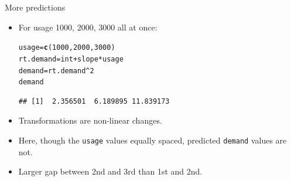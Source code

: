 \documentclass[unknownkeysallowed]{beamer}\usepackage[]{graphicx}\usepackage[]{color}
\makeatletter
\newcommand{\hlnum}[1]{\textcolor[rgb]{0.686,0.059,0.569}{#1}}%
\newcommand{\hlopt}[1]{\textcolor[rgb]{0,0,0}{#1}}%
\newcommand{\hlstd}[1]{\textcolor[rgb]{0.345,0.345,0.345}{#1}}%
\newcommand{\hlkwb}[1]{\textcolor[rgb]{0.69,0.353,0.396}{#1}}%
\newcommand{\hlkwd}[1]{\textcolor[rgb]{0.737,0.353,0.396}{\textbf{#1}}}%
\newenvironment{kframe}{%
 \def\at@end@of@kframe{}%
 \ifinner\ifhmode%
  \def\at@end@of@kframe{\end{minipage}}%
  \begin{minipage}{\columnwidth}%
 \fi\fi%
 \def\FrameCommand##1{\hskip\@totalleftmargin \hskip-\fboxsep
 \colorbox{shadecolor}{##1}\hskip-\fboxsep
     \hskip-\linewidth \hskip-\@totalleftmargin \hskip\columnwidth}%
 \MakeFramed {\advance\hsize-\width
   \@totalleftmargin\z@ \linewidth\hsize
   \@setminipage}}%
 {\par\unskip\endMakeFramed%
 \at@end@of@kframe}
\newenvironment{knitrout}{}{} %
\makeatother
\begin{document}
\begin{frame}[fragile]{More predictions}

  \begin{itemize}
  \item For usage 1000, 2000, 3000 all at once:
\begin{knitrout}
\color{fgcolor}\begin{kframe}
\begin{alltt}
\hlstd{usage}\hlkwb{=}\hlkwd{c}\hlstd{(}\hlnum{1000}\hlstd{,}\hlnum{2000}\hlstd{,}\hlnum{3000}\hlstd{)}
\hlstd{rt.demand}\hlkwb{=}\hlstd{int}\hlopt{+}\hlstd{slope}\hlopt{*}\hlstd{usage}
\hlstd{demand}\hlkwb{=}\hlstd{rt.demand}\hlopt{^}\hlnum{2}
\hlstd{demand}
\end{alltt}
\begin{verbatim}
## [1]  2.356501  6.189895 11.839173
\end{verbatim}
\end{kframe}
\end{knitrout}
\item Transformations are non-linear changes.
\item Here, though the \texttt{usage} values equally spaced, predicted
  \texttt{demand} values are not.
\item Larger gap between 2nd and 3rd than 1st and 2nd.
  \end{itemize}

\end{frame}
\end{document}
